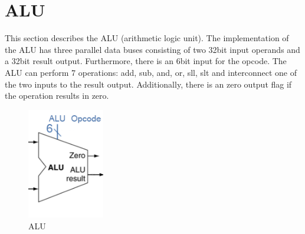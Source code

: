 \section{ALU}
This section describes the ALU (arithmetic logic unit). The implementation of the ALU has three parallel data buses consisting of two 32bit input operands and a 32bit result output.
Furthermore, there is an 6bit input for the opcode. The ALU can perform 7 operations: add, sub, and, or, sll, slt and interconnect one of the two inputs to the result output. 
Additionally, there is an zero output flag if the operation results in zero.

\begin{figure}[h!]
  \centering
  \includegraphics[width=0.3\textwidth]{figure/alu.png}
  \caption{ALU}
  \label{fig:ALU}
\end{figure}

